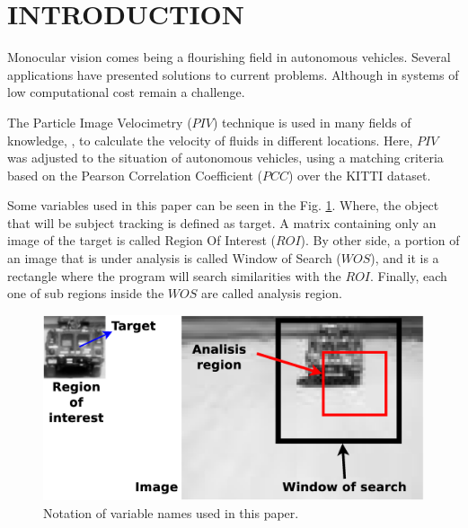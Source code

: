 \section{INTRODUCTION}

Monocular vision comes being a flourishing field in autonomous vehicles. 
Several applications have presented solutions to current problems. 
Although in systems  of low computational cost remain a challenge. 


The Particle Image Velocimetry ($PIV$)\cite{Bastiaans} technique is used in many fields of 
knowledge, \cite{Story, Xu}, to calculate the velocity of fluids in different locations. 
Here, $PIV$ was adjusted to the situation of autonomous vehicles, using a matching criteria based on 
the Pearson Correlation Coefficient ($PCC$)\cite{Miranda Neto} over the KITTI dataset\cite{Geiger}.

Some variables used in this paper can be seen in the Fig. \ref{fig:systemnotation}. 
Where, the object that will be subject tracking is defined as target.
A matrix containing only an image of the target is called Region Of Interest ($ROI$).
By other side, a portion of an image that is under analysis is called Window of Search ($WOS$), 
and it is a rectangle where the program will search similarities with the $ROI$.
Finally, each one of sub regions inside the $WOS$ are called analysis region.

\begin{figure}[bhp]
\centering
\includegraphics[width=0.7\columnwidth]{images/Diagrama2.eps}
\caption{Notation of variable names used in this paper.}
\label{fig:systemnotation}
\end{figure}

